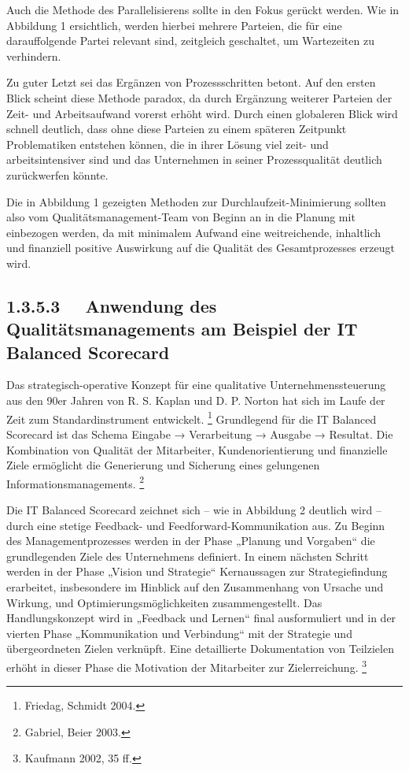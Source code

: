 \documentclass[a4paper]{article}
\begin{document}
{\sffamily
Auch die Methode des Parallelisierens sollte in den Fokus gerückt werden. Wie in Abbildung 1 ersichtlich, werden hierbei
mehrere Parteien, die für eine darauffolgende Partei relevant sind, zeitgleich geschaltet, um Wartezeiten zu
verhindern. }


\bigskip

{\sffamily
Zu guter Letzt sei das Ergänzen von Prozessschritten betont. Auf den ersten Blick scheint diese Methode paradox, da
durch Ergänzung weiterer Parteien der Zeit- und Arbeitsaufwand vorerst erhöht wird. Durch einen globaleren Blick wird
schnell deutlich, dass ohne diese Parteien zu einem späteren Zeitpunkt Problematiken entstehen können, die in ihrer
Lösung viel zeit- und arbeitsintensiver sind und das Unternehmen in seiner Prozessqualität deutlich zurückwerfen
könnte.}


\bigskip

{\sffamily
Die in Abbildung 1 gezeigten Methoden zur Durchlaufzeit-Minimierung sollten also vom Qualitätsmanagement-Team von Beginn
an in die Planung mit einbezogen werden, da mit minimalem Aufwand eine weitreichende, inhaltlich und finanziell
positive Auswirkung auf die Qualität des Gesamtprozesses erzeugt wird. }

\subsection[1.3.5.3 \ \ Anwendung des Qualitätsmanagements am Beispiel der IT Balanced Scorecard]{1.3.5.3 \ \ Anwendung
des Qualitätsmanagements am Beispiel der IT Balanced Scorecard}
{\sffamily
Das strategisch-operative Konzept für eine qualitative Unternehmenssteuerung aus den 90er Jahren von R. S. Kaplan und D.
P. Norton hat sich im Laufe der Zeit zum Standardinstrument entwickelt. \footnote{Friedag, Schmidt 2004.} Grundlegend
für die IT Balanced Scorecard ist das Schema Eingabe → Verarbeitung → Ausgabe → Resultat. Die Kombination von Qualität
der Mitarbeiter, Kundenorientierung und finanzielle Ziele ermöglicht die Generierung und Sicherung eines gelungenen
Informationsmanagements. \footnote{Gabriel, Beier 2003.} }


\bigskip


\bigskip

{\sffamily
Die IT Balanced Scorecard zeichnet sich – wie in Abbildung 2 deutlich wird – durch eine stetige Feedback- und
Feedforward-Kommunikation aus. Zu Beginn des Managementprozesses werden in der Phase „Planung und Vorgaben“ die
grundlegenden Ziele des Unternehmens definiert. In einem nächsten Schritt werden in der Phase „Vision und Strategie“
Kernaussagen zur Strategiefindung erarbeitet, insbesondere im Hinblick auf den Zusammenhang von Ursache und Wirkung,
und Optimierungsmöglichkeiten zusammengestellt. Das Handlungskonzept wird in „Feedback und Lernen“ final ausformuliert
und in der vierten Phase „Kommunikation und Verbindung“ mit der Strategie und übergeordneten Zielen verknüpft. Eine
detaillierte Dokumentation von Teilzielen erhöht in dieser Phase die Motivation der Mitarbeiter zur Zielerreichung.
\footnote{Kaufmann 2002, 35 ff.} }
\end{document}
